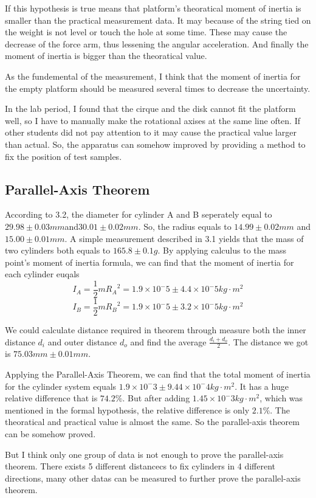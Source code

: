 \documentclass[12pt,a4paper]{article}
\begin{document}
If this hypothesis is true means that platform's theoratical moment of inertia is smaller than the practical measurement data. It may because of the string tied on the weight is not level or touch the hole at some time. These may cause the decrease of the force arm, thus lessening the angular acceleration. And finally the moment of inertia is bigger than the theoratical value.\par

As the fundemental of the measurement, I think that the moment of inertia for the empty platform should be measured several times to decrease the uncertainty. \par

In the lab period, I found that the cirque and the disk cannot fit the platform well, so I have to manually make the rotational axises at the same line often. If other students did not pay attention to it may cause the practical value larger than actual. So, the apparatus can somehow improved by providing a method to fix the position of test samples.

\subsection{Parallel-Axis Theorem}

According to 3.2, the diameter for cylinder A and B seperately equal to $29.98\pm0.03mm$and$30.01\pm0.02mm$. So, the radius equals to $14.99\pm0.02mm$ and $15.00\pm0.01mm$. A simple measurement described in 3.1 yields that the mass of two cylinders both equals to $165.8\pm0.1g$. By applying calculus to the mass point's moment of inertia formula, we can find that the moment of inertia for each cylinder euqals $$I_A=\frac{1}{2}m{R_{A}}^2=1.9\times 10^-5\pm 4.4\times 10^-5kg\cdot m^2$$$$I_B=\frac{1}{2}m{R_{B}}^2=1.9\times 10^-5\pm 3.2\times 10^-5kg\cdot m^2$$\par
We could calculate distance required in theorem through measure both the inner distance $d_i$ and outer distance $d_o$ and find the average $\frac{d_i+d_o}{2}$. The distance we got is $75.03mm\pm 0.01mm$.\par 
Applying the Parallel-Axis Theorem, we can find that the total moment of inertia for the cylinder system equals $1.9\times 10^-3\pm 9.44\times 10^-4kg\cdot m^2$. It has a huge relative difference that is $74.2\%$. But after adding $1.45\times 10^-3kg\cdot m^2$, which was mentioned in the formal hypothesis, the relative difference is only $2.1\%$. The theoratical and practical value is almost the same. So the parallel-axis theorem can be somehow proved. \par 
But I think only one group of data is not enough to prove the parallel-axis theorem. There exists 5 different distancecs to fix cylinders in 4 different directions, many other datas can be measured to further prove the parallel-axis theorem.
\end{document}
